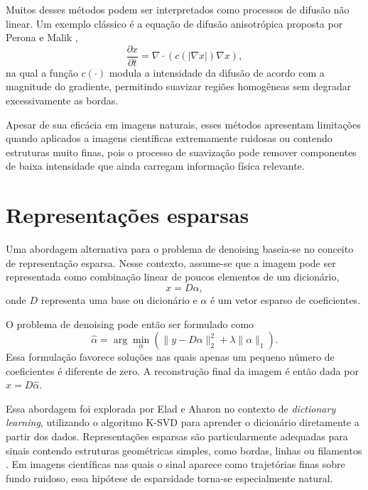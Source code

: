 \documentclass[
        oneside,      %
        english,			
        brazil			 
        ]{abntbibufjf}
\begin{document}
Muitos desses métodos podem ser interpretados como processos de difusão não linear. Um exemplo clássico é a equação de difusão anisotrópica proposta por Perona e Malik \cite{perona1990scale},
\begin{equation}
\frac{\partial x}{\partial t}
=
\nabla \cdot
\left(
c(|\nabla x|)\nabla x
\right),
\end{equation}
na qual a função $c(\cdot)$ modula a intensidade da difusão de acordo com a magnitude do gradiente, permitindo suavizar regiões homogêneas sem degradar excessivamente as bordas.

Apesar de sua eficácia em imagens naturais, esses métodos apresentam limitações quando aplicados a imagens científicas extremamente ruidosas ou contendo estruturas muito finas, pois o processo de suavização pode remover componentes de baixa intensidade que ainda carregam informação física relevante.

\section{Representações esparsas}

Uma abordagem alternativa para o problema de denoising baseia-se no conceito de representação esparsa. Nesse contexto, assume-se que a imagem pode ser representada como combinação linear de poucos elementos de um dicionário,
\begin{equation}
x = D\alpha,
\end{equation}
onde $D$ representa uma base ou dicionário e $\alpha$ é um vetor esparso de coeficientes.

O problema de denoising pode então ser formulado como
\begin{equation}
\hat{\alpha}
=
\arg\min_\alpha
\left(
\|y-D\alpha\|_2^2 + \lambda \|\alpha\|_1
\right).
\end{equation}
Essa formulação favorece soluções nas quais apenas um pequeno número de coeficientes é diferente de zero. A reconstrução final da imagem é então dada por $\hat{x}=D\hat{\alpha}$.

Essa abordagem foi explorada por Elad e Aharon \cite{elad2006ksvd} no contexto de \textit{dictionary learning}, utilizando o algoritmo K-SVD para aprender o dicionário diretamente a partir dos dados. Representações esparsas são particularmente adequadas para sinais contendo estruturas geométricas simples, como bordas, linhas ou filamentos \cite{starck2010sparse}. Em imagens científicas nas quais o sinal aparece como trajetórias finas sobre fundo ruidoso, essa hipótese de esparsidade torna-se especialmente natural.
\end{document}
